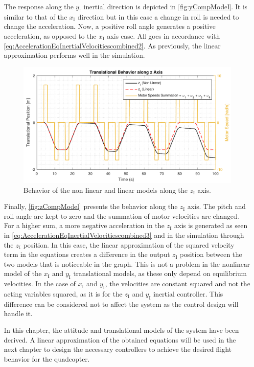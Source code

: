 The response along the $y_{\mathrm{I}}$ inertial direction is depicted in \autoref{fig:yCompModel}. It is similar to that of the $x_{\mathrm{I}}$ direction but in this case a change in roll is needed to change the acceleration. Now, a positive roll angle generates a positive acceleration, as opposed to the $x_{\mathrm{I}}$ axis case. All goes in accordance with \autoref{eq:AccelerationEqInertialVelocitiescombined2}. As previously, the linear approximation performs well in the simulation.
 
\begin{figure}[H]
	\centering
	\includegraphics[scale=0.65]{figures/zCompModel}
	\caption{Behavior of the non linear and linear models along the $z_{\mathrm{I}}$ axis.}
	\label{fig:zCompModel}
\end{figure}
Finally, \autoref{fig:zCompModel} presents the behavior along the $z_{\mathrm{I}}$ axis. The pitch and roll angle are kept to zero and the summation of motor velocities are changed. For a higher sum, a more negative acceleration in the $z_{\mathrm{I}}$ axis is generated as seen in \autoref{eq:AccelerationEqInertialVelocitiescombined3} and in the simulation through the $z_{\mathrm{I}}$ position. In this case, the linear approximation of the squared velocity term in the equations creates a difference in the output $z_{\mathrm{I}}$ position between the two models that is noticeable in the graph. 
This is not a problem in the nonlinear model of the $x_{\mathrm{I}}$ and $y_{\mathrm{I}}$ translational models, as these only depend on equilibrium velocities. In the case of $x_{\mathrm{I}}$ and $y_{\mathrm{I}}$, the velocities are constant squared and not the acting variables squared, as it is for the $z_{\mathrm{I}}$ and $y_{\mathrm{I}}$ inertial controller.
This difference can be considered not to affect the system as the control design will handle it. 

In this chapter, the attitude and translational models of the system have been derived. A linear approximation of the obtained equations will be used in the next chapter to design the necessary controllers to achieve the desired flight behavior for the quadcopter.
